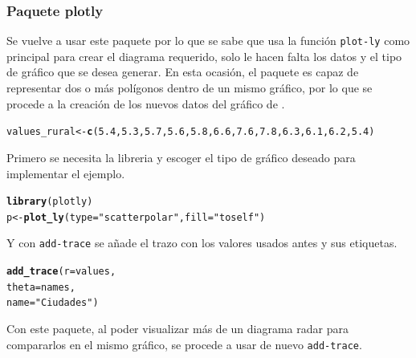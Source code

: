 \documentclass{article}\usepackage[]{graphicx}\usepackage[]{color}
\makeatletter
\newcommand{\hlnum}[1]{\textcolor[rgb]{0.686,0.059,0.569}{#1}}%
\newcommand{\hlstr}[1]{\textcolor[rgb]{0.192,0.494,0.8}{#1}}%
\newcommand{\hlstd}[1]{\textcolor[rgb]{0.345,0.345,0.345}{#1}}%
\newcommand{\hlkwb}[1]{\textcolor[rgb]{0.69,0.353,0.396}{#1}}%
\newcommand{\hlkwd}[1]{\textcolor[rgb]{0.737,0.353,0.396}{\textbf{#1}}}%
\newenvironment{kframe}{%
 \def\at@end@of@kframe{}%
 \ifinner\ifhmode%
  \def\at@end@of@kframe{\end{minipage}}%
  \begin{minipage}{\columnwidth}%
 \fi\fi%
 \def\FrameCommand##1{\hskip\@totalleftmargin \hskip-\fboxsep
 \colorbox{shadecolor}{##1}\hskip-\fboxsep
     \hskip-\linewidth \hskip-\@totalleftmargin \hskip\columnwidth}%
 \MakeFramed {\advance\hsize-\width
   \@totalleftmargin\z@ \linewidth\hsize
   \@setminipage}}%
 {\par\unskip\endMakeFramed%
 \at@end@of@kframe}
\newenvironment{knitrout}{}{} %
\makeatother
\begin{document}
\subsubsection{Paquete plotly}
Se vuelve a usar este paquete \cite{docu_plotly}
por lo que se sabe que usa la funci\'on \texttt{plot-ly} como principal para crear el diagrama requerido, solo le hacen falta los datos y el tipo de gr\'afico que se desea generar. En esta ocasi\'on, el paquete es capaz de representar dos o m\'as pol\'igonos dentro de un mismo gr\'afico, por lo que se procede a la creaci\'on de los nuevos datos del gr\'afico de \cite[p\'ag 151]{Circle}
.

\begin{knitrout}
\color{fgcolor}\begin{kframe}
\begin{alltt}
\hlstd{values_rural} \hlkwb{<-} \hlkwd{c}\hlstd{(}\hlnum{5.4}\hlstd{,} \hlnum{5.3}\hlstd{,} \hlnum{5.7}\hlstd{,} \hlnum{5.6}\hlstd{,} \hlnum{5.8}\hlstd{,} \hlnum{6.6}\hlstd{,} \hlnum{7.6}\hlstd{,} \hlnum{7.8}\hlstd{,} \hlnum{6.3}\hlstd{,} \hlnum{6.1}\hlstd{,} \hlnum{6.2}\hlstd{,} \hlnum{5.4}\hlstd{)}
\end{alltt}
\end{kframe}
\end{knitrout}
Primero se necesita la libreria y escoger el tipo de gr\'afico deseado para implementar el ejemplo.
\begin{knitrout}
\color{fgcolor}\begin{kframe}
\begin{alltt}
\hlkwd{library}(plotly)
p <- \hlkwd{plot_ly}(type = \hlstr{"scatterpolar"}, fill = \hlstr{"toself"}) %
\end{alltt}
\end{kframe}
\end{knitrout}
Y con \texttt{add-trace} se a\~nade el trazo con los valores usados antes y sus etiquetas.
\begin{knitrout}
\color{fgcolor}\begin{kframe}
\begin{alltt}
  \hlkwd{add_trace}( r = values,
             theta = names,
             name = \hlstr{"Ciudades"}) %
\end{alltt}
\end{kframe}
\end{knitrout}
Con este paquete, al poder visualizar m\'as de un diagrama radar para compararlos en el mismo gr\'afico, se procede a usar de nuevo \texttt{add-trace}.
\end{document}
